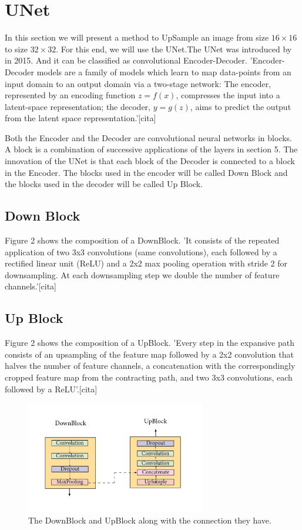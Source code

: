 \documentclass{article}
\theoremstyle{definition}
\begin{document}
\section{UNet}
In this section we will present a method to UpSample an image from size $16\times 16$ to size $32\times 32$. For this end, we will use the UNet.The UNet was introduced by in 2015. And it can be classified as convolutional Encoder-Decoder. 'Encoder-Decoder models are a family of models which learn to map data-points from an input domain to an output domain via a two-stage network: The encoder, represented by an encoding function $z = f(x)$, compresses the input into a latent-space representation; the decoder, $y = g(z)$, aims to predict the output from the latent space representation.'[cita]

\noindent
Both the Encoder and the Decoder are convolutional neural networks in blocks. A block is a combination of successive applications of the layers in section 5. The innovation of the UNet is that each block of the Decoder is connected to a block in the Encoder. The blocks used in the encoder will be called Down Block and the blocks used in the decoder will be called Up Block.

\subsection{Down Block}
Figure 2 shows the composition of a DownBlock.  'It consists of the repeated application of two 3x3 convolutions (same convolutions), each followed by a rectified linear unit (ReLU) and a 2x2 max pooling operation with stride 2 for downsampling. At each downsampling step we double the number of feature channels.'[cita]

\subsection{Up Block}
Figure 2 shows the composition of a UpBlock. 'Every step in the expansive path consists of an upsampling of the feature map followed by a 2x2 convolution that halves the number of feature channels, a concatenation with the correspondingly cropped
feature map from the contracting path, and two 3x3 convolutions, each followed by a ReLU'.[cita]

\begin{figure}[h]
    \centering
    \includegraphics[width=0.7\textwidth]{Imagenes/DownUp.png}
    \caption{The DownBlock and UpBlock along with the connection they have.}
    \label{fig:mesh1}
\end{figure}
\end{document}

